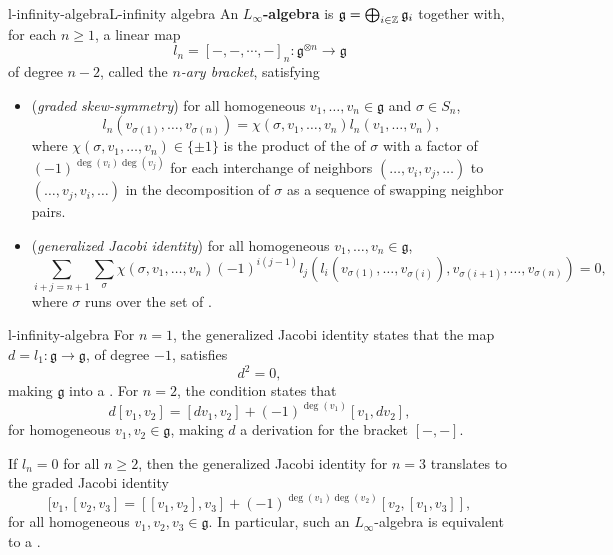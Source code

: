 \begin{topic}{l-infinity-algebra}{L-infinity algebra}
    An \textbf{$L_\infty$-algebra} is   $\mathfrak{g} = \bigoplus_{i \in \mathbb{Z}} \mathfrak{g}_i$ together with, for each $n \ge 1$, a linear map
    \[ l_n = [-, -, \cdots, -]_n \colon \mathfrak{g}^{\otimes n} \to \mathfrak{g} \]
    of degree $n - 2$, called the \textit{$n$-ary bracket}, satisfying
    \begin{itemize}
        \item (\textit{graded skew-symmetry}) for all homogeneous $v_1, \ldots, v_n \in \mathfrak{g}$ and  $\sigma \in S_n$,
        \[ l_n(v_{\sigma(1)}, \ldots, v_{\sigma(n)}) = \chi(\sigma, v_1, \ldots, v_n) l_n(v_1, \ldots, v_n) , \]
        where $\chi(\sigma, v_1, \ldots, v_n) \in \{ \pm 1 \}$ is the product of the  of $\sigma$ with a factor of $(-1)^{\deg(v_i) \deg(v_j)}$ for each interchange of neighbors $(\ldots, v_i, v_j, \ldots)$ to $(\ldots, v_j, v_i, \ldots)$ in the decomposition of $\sigma$ as a sequence of swapping neighbor pairs.
        \item (\textit{generalized Jacobi identity}) for all homogeneous $v_1, \ldots, v_n \in \mathfrak{g}$,
        \[ \sum_{i + j = n + 1} \sum_{\sigma} \chi(\sigma, v_1, \ldots, v_n) (-1)^{i(j - 1)} l_j(l_i(v_{\sigma(1)}, \ldots, v_{\sigma(i)}), v_{\sigma(i + 1)}, \ldots, v_{\sigma(n)}) = 0 , \]
        where $\sigma$ runs over the set of .
    \end{itemize}
\end{topic}

\begin{example}{l-infinity-algebra}
    For $n = 1$, the generalized Jacobi identity states that the map $d = l_1 \colon \mathfrak{g} \to \mathfrak{g}$, of degree $-1$, satisfies
    \[ d^2 = 0 , \]
    making $\mathfrak{g}$ into a . For $n = 2$, the condition states that
    \[ d[v_1, v_2] = [dv_1, v_2] + (-1)^{\deg(v_1)} [v_1, dv_2] , \]
    for homogeneous $v_1, v_2 \in \mathfrak{g}$, making $d$ a derivation for the bracket $[-, -]$.
    
    If $l_n = 0$ for all $n \ge 2$, then the generalized Jacobi identity for $n = 3$ translates to the graded Jacobi identity
    \[ [v_1, [v_2, v_3] = [[v_1, v_2], v_3] + (-1)^{\deg(v_1) \deg(v_2)} [v_2, [v_1, v_3]] , \]
    for all homogeneous $v_1, v_2, v_3 \in \mathfrak{g}$. In particular, such an $L_\infty$-algebra is equivalent to a .
\end{example}

